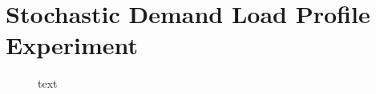 \section{Stochastic Demand Load Profile Experiment}

\begin{figure}[h]
	\centering
	
	\caption{text}
\end{figure}


